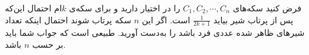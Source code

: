     \p 
فرض کنید سکه‌های
$C_1, C_2, \cdots , C_n$
را در اختیار دارید و برای سکه‌ی $k$ام احتمال این‌که پس از پرتاب شیر بیاید
$\frac{1}{2k + 1}$
است. اگر این
$n$
سکه پرتاب شوند احتمال اینکه تعداد شیرهای ظاهر شده عددی فرد باشد را به‌دست آورید. طبیعی است که جواب شما باید بر حسب
$n$
باشد.